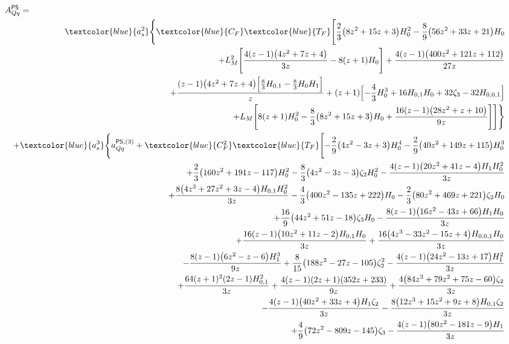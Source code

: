 \begin{eqnarray}
\lefteqn{A_{Qq}^{\sf PS} =} &&
\nonumber \\ &&
\textcolor{blue}{a_s^2} \Biggl\{
\textcolor{blue}{C_F} \textcolor{blue}{T_F} 
\Biggl[\frac{2}{3} \big(8 z^2+15 z+3\big) H_0^2-\frac{8}{9} \big(56z^2+33 z+21\big) H_0
\nonumber\\&&
+ L_M^2 \Biggl[\frac{4 (z-1) \big(4 z^2+7 z+4\big)}{3 z}-8 (z+1) H_0\Biggr]+\frac{4 (z-1) \big(400 z^2+121 z+112\big)}{27 z}
\nonumber\\&&
+\frac{(z-1) \big(4 z^2+7 z+4\big) \Bigl[\frac{8}{3} H_{0,1}-\frac{8}{3} H_0  H_1\Bigr]}{z}+(z+1) \Bigl[-\frac{4}{3} H_0^3+16 H_{0,1} H_0+32 \zeta_3-32
H_{0,0,1}\Bigr]
\nonumber\\&&
+L_M \Biggl[8 (z+1) H_0^2-\frac{8}{3} \big(8 z^2+15 z+3\big) H_0+\frac{16 (z-1)  \big(28 z^2+z+10\big)}{9 z}\Biggr] \Biggr]
\Biggr\}
\nonumber\\&&
%
+ \textcolor{blue}{a_s^3} \Biggl\{
%
a_{Qq}^{{\sf PS},(3)}
%
+\textcolor{blue}{C_F^2} \textcolor{blue}{T_F}
\Biggl[-\frac{2}{9} \big(4  z^2-3 z+3\big) H_0^4-\frac{2}{9} \big(40 z^2+149 z+115\big) H_0^3
\nonumber\\&&
+\frac{2}{3} \big(160 z^2+191 z-117\big) H_0^2-\frac{8}{3} \big(4 z^2-3 z-3\big) \zeta_2 H_0^2-\frac{4 (z-1) \big(20  z^2+41 z-4\big) H_1 H_0^2}{3 z}
\nonumber\\&&
+\frac{8 \big(4 z^3+27 z^2+3 z-4\big) H_{0,1} H_0^2}{3 z}-\frac{4}{3} \big(400z^2-135 z+222\big) H_0-\frac{2}{3} \big(80 z^2+469 z+221\big) \zeta_2 H_0
\nonumber\\&&
+\frac{16}{9} \big(44 z^2+51 z-18\big) \zeta_3 H_0-\frac{8 (z-1) \big(16  z^2-43 z+66\big) H_1 H_0}{3 z}
\nonumber\\&&
+\frac{16 (z-1) \big(10 z^2+11 z-2\big) H_{0,1} H_0}{3 z}+\frac{16 \big(4  z^3-33 z^2-15 z+4\big) H_{0,0,1} H_0}{3 z}
\nonumber\\&&
-\frac{8 (z-1) \big(6 z^2-z-6\big)
  H_1^3}{9 z}
+\frac{8}{15} \big(188 z^2-27 z-105\big) \zeta_2^2-\frac{4 (z-1) \big(24  z^2-13 z+17\big) H_1^2}{3 z}
\nonumber\\&&
+\frac{64 (z+1)^2 (2 z-1) H_{0,1}^2}{3 z}
+\frac{4 (z-1) (2 z+1) (352 z+233)}{9 z}+\frac{4 \big(84 z^3+79 z^2+75  z-60\big) \zeta_2}{3 z}
\nonumber\\&&
-\frac{4 (z-1) \big(40 z^2+33 z+4\big) H_1 \zeta_2}{3 z}-\frac{8 \big(12  z^3+15 z^2+9 z+8\big) H_{0,1} \zeta_2}{3 z}
\nonumber\\&&
+\frac{4}{9} \big(72 z^2-809 z-145\big) \zeta_3-\frac{4 (z-1) \big(80  z^2-181 z-9\big) H_1}{3 z}

\end{eqnarray}
